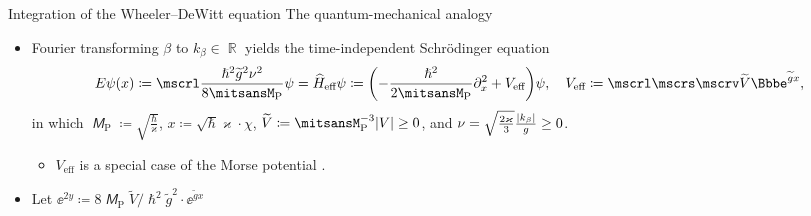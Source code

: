 \documentclass[8pt]{beamer}
\begin{document}
\begin{frame}%
{Integration of the Wheeler--DeWitt equation}%
{The quantum-mechanical analogy}
\begin{itemize}
\item Fourier transforming $\beta$ to $k_\beta \in \BbbR$ yields the
time-independent Schr\"odinger equation
\begin{align}
E \rfun{\psi}{x} \coloneqq
\mscrl \frac{\hslash^2\widetilde{g}^2\nu^2}{8\mitsansM_\text{P}} \psi
= \widehat{H}_\text{eff} \psi \coloneqq
\rbr{-\frac{\hslash^2}{2 \mitsansM_\text{P}} \partial_x^2
+ V_{\text{eff}}} \psi,\quad
V_{\text{eff}} \coloneqq
\mscrl \mscrs \mscrv \widetilde{V} \ee^{\widetilde{g} x},
\end{align}
in which $\mitsansM_\text{P} \coloneqq \sqrt{\frac{\hslash}{\varkappa}}$,
$x \coloneqq \sqrt{\hslash}\varkappa\cdot\chi$,
$\widetilde{V} \coloneqq \mitsansM_\text{P}^{-3} \vbr{V} \ge 0$, and
$\nu = \sqrt{\frac{2\varkappa}{3}} \frac{{\left|k_\beta\right|}}{g} \ge 0$.
\begin{itemize}
\item $V_{\text{eff}}$ is a special case of the Morse potential%
.
\end{itemize}

\item Let $\ee^{2y} \coloneqq
8\mitsansM_{\text{P}}\widetilde{V}/\hslash^2\widetilde{g}^2\cdot
\ee^{\widetilde{g}x}$


\end{itemize}


\end{frame}
\end{document}

